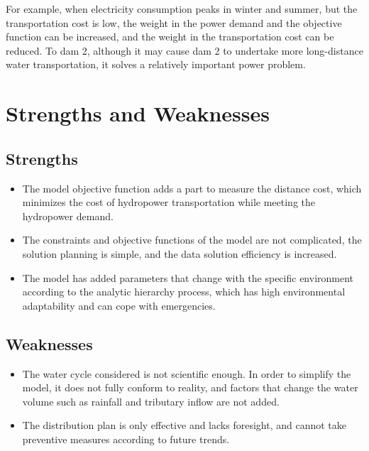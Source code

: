 \documentclass{mcmthesis}
\begin{document}
For example, when electricity consumption peaks in winter and summer, but the transportation cost is low, the weight in the power demand and the objective function can be increased, and the weight in the transportation cost can be reduced. To dam 2, although it may cause dam 2 to undertake more long-distance water transportation, it solves a relatively important power problem.
\section{Strengths and Weaknesses}

\subsection{Strengths}
\begin{itemize}
	\item The model objective function adds a part to measure the distance cost, which minimizes the cost of hydropower transportation while meeting the hydropower demand.
	\item The constraints and objective functions of the model are not complicated, the solution planning is simple, and the data solution efficiency is increased.
	\item The model has added parameters that change with the specific environment according to the analytic hierarchy process, which has high environmental adaptability and can cope with emergencies.
\end{itemize}

\subsection{Weaknesses}
\begin{itemize}
	\item The water cycle considered is not scientific enough. In order to simplify the model, it does not fully conform to reality, and factors that change the water volume such as rainfall and tributary inflow are not added.
	\item The distribution plan is only effective and lacks foresight, and cannot take preventive measures according to future trends.
\end{itemize}
\end{document}
